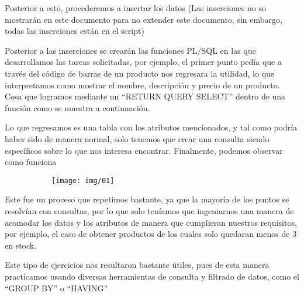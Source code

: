 \documentclass[letterpaper,12pt]{article}
\begin{document}
	
	
	Posterior a esto, procederemos a insertar los datos (Las inserciones no so mostrarán en este documento para no extender este documento, sin embargo, todas las inserciones están en el script)
	
	Posterior a las inserciones se crearán las funciones PL/SQL en las que desarrollamos las tareas solicitadas, por ejemplo, el primer punto pedía que a través del código de barras de un producto nos regresara la utilidad, lo que interpretamos como mostrar el nombre, descripción y precio de un producto. Cosa que logramos mediante un “RETURN QUERY SELECT” dentro de una función como se muestra a continuación.
	
	 
	
	Lo que regresamos es una tabla con los atributos mencionados, y tal como podría haber sido de manera normal, solo tenemos que crear una consulta siendo específicos sobre lo que nos interesa encontrar. 
	Finalmente, podemos observar como funciona 
	
	
	\begin{figure}[H]

		\begin{subfigure}{20cm}

			\centering

			\texttt{[image: img/01]}

		\end{subfigure}

	\end{figure}

	Este fue un proceso que repetimos bastante, ya que la mayoría de los puntos se resolvían con consultas, por lo que solo teníamos que ingeniarnos una manera de acomodar los datos y los atributos de manera que cumplieran nuestros requisitos, por ejemplo, el caso de obtener productos de los cuales solo quedaran menos de 3 en stock.
	
		
		
	Este tipo de ejercicios nos resultaron bastante útiles, pues de esta manera practicamos usando diversas herramientas de consulta y filtrado de datos, como el “GROUP BY” o “HAVING”
	
\end{document}
